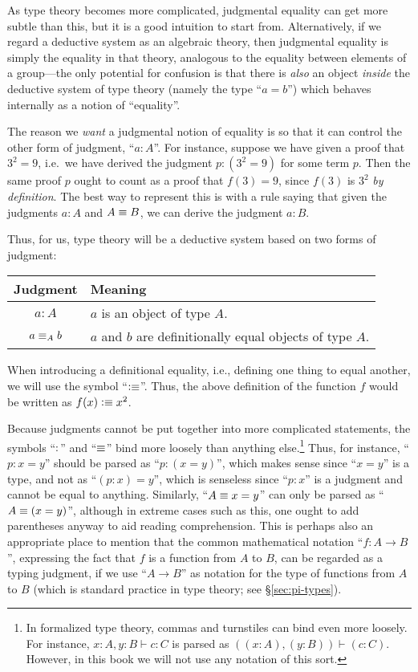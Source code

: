 {As type theory becomes more complicated, judgmental equality can get more subtle than this, but it is a good intuition to start from.
Alternatively, if we regard a deductive system as an algebraic theory, then judgmental equality is simply the equality in that theory, analogous to the equality between elements of a group---the only potential for confusion is that there is \emph{also} an object \emph{inside} the deductive system of type theory (namely the type ``$a=b$'') which behaves internally as a notion of ``equality''.

The reason we \emph{want} a judgmental notion of equality is so that it can control the other form of judgment, ``$a:A$''.
For instance, suppose we have given a proof that $3^2=9$, i.e.\ we have derived the judgment $p:(3^2=9)$ for some term $p$.
Then the same proof $p$ ought to count as a proof that $f(3)=9$, since $f(3)$ is $3^2$ \emph{by definition}.
The best way to represent this is with a rule saying that given the judgments $a:A$ and $A\equiv B$, we can derive the judgment $a:B$.

Thus, for us, type theory will be a deductive system based on two forms of judgment:
\begin{center}
\begin{tabular}{c|l}
  \textbf{Judgment} & \textbf{Meaning}\\\hline
  $a : A$ & $a$ is an object of type $A$.\\
  $a \equiv_A b$ & $a$ and $b$ are definitionally equal objects of type $A$.
\end{tabular}
\end{center}
When introducing a definitional equality, i.e., defining one thing to equal another, we will use the symbol ``$\vcentcolon\equiv$''.
Thus, the above definition of the function $f$ would be written as $f(x)\vcentcolon\equiv x^2$.

Because judgments cannot be put together into more complicated statements, the symbols ``$:$'' and ``$\equiv$'' bind more loosely than anything else.\footnote{In formalized type theory, commas and turnstiles can bind even more loosely.
  For instance, $x:A,y:B\vdash c:C$ is parsed as $((x:A),(y:B))\vdash (c:C)$.
  However, in this book we will not use any notation of this sort.}
Thus, for instance, ``$p:x=y$'' should be parsed as ``$p:(x=y)$'', which makes sense since ``$x=y$'' is a type, and not as ``$(p:x)=y$'', which is senseless since ``$p:x$'' is a judgment and cannot be equal to anything.
Similarly, ``$A\equiv x=y$'' can only be parsed as ``$A\equiv(x=y)$'', although in extreme cases such as this, one ought to add parentheses anyway to aid reading comprehension.
This is perhaps also an appropriate place to mention that the common mathematical notation ``$f:A\to B$'', expressing the fact that $f$ is a function from $A$ to $B$, can be regarded as a typing judgment, if we use ``$A\to B$'' as notation for the type of functions from $A$ to $B$ (which is standard practice in type theory; see \S\ref{sec:pi-types}).

}
